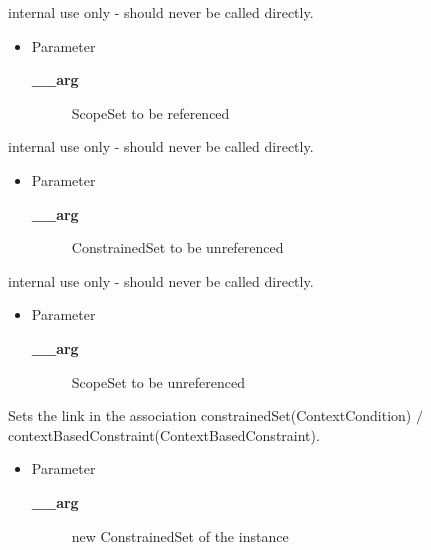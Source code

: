 \begin{desc}internal use only - should never be called directly.
\begin{itemize}
\item{Parameter
  \begin{description}
   \item[{\bf \_\_arg}]{ScopeSet to be referenced}
  \end{description}}
\end{itemize}
\end{desc}

\begin{desc}internal use only - should never be called directly.
\begin{itemize}
\item{Parameter
  \begin{description}
   \item[{\bf \_\_arg}]{ConstrainedSet to be unreferenced}
  \end{description}}
\end{itemize}
\end{desc}

\begin{desc}internal use only - should never be called directly.
\begin{itemize}
\item{Parameter
  \begin{description}
   \item[{\bf \_\_arg}]{ScopeSet to be unreferenced}
  \end{description}}
\end{itemize}
\end{desc}

\begin{desc}Sets the link in the association constrainedSet(ContextCondition)
 $/$ contextBasedConstraint(ContextBasedConstraint).
\begin{itemize}
\item{Parameter
  \begin{description}
   \item[{\bf \_\_arg}]{new ConstrainedSet of the instance}
  \end{description}}
\end{itemize}
\end{desc}

